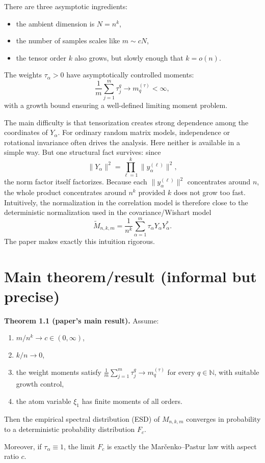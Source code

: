 \documentclass[11pt]{article}
\begin{document}
There are three asymptotic ingredients:
\begin{itemize}
    \item the ambient dimension is $N=n^k$,
    \item the number of samples scales like $m\sim cN$,
    \item the tensor order $k$ also grows, but slowly enough that $k=o(n)$.
\end{itemize}
The weights $\tau_\alpha>0$ have asymptotically controlled moments:
\[
\frac1m\sum_{j=1}^m \tau_j^q \to m_q^{(\tau)} < \infty,
\]
with a growth bound ensuring a well-defined limiting moment problem.

The main difficulty is that tensorization creates strong dependence among the coordinates of $Y_\alpha$. For ordinary random matrix models, independence or rotational invariance often drives the analysis. Here neither is available in a simple way. But one structural fact survives: since
\[
\|Y_\alpha\|^2 = \prod_{\ell=1}^k \|y_\alpha^{(\ell)}\|^2,
\]
the norm factor itself factorizes. Because each $\|y_\alpha^{(\ell)}\|^2$ concentrates around $n$, the whole product concentrates around $n^k$ provided $k$ does not grow too fast. Intuitively, the normalization in the correlation model is therefore close to the deterministic normalization used in the covariance/Wishart model
\[
\widetilde M_{n,k,m}=\frac1{n^k}\sum_{\alpha=1}^m \tau_\alpha Y_\alpha Y_\alpha^*.
\]
The paper makes exactly this intuition rigorous.

\section*{Main theorem/result (informal but precise)}
\textbf{Theorem 1.1 (paper's main result).} Assume:
\begin{enumerate}
    \item $m/n^k \to c\in(0,\infty)$,
    \item $k/n\to 0$,
    \item the weight moments satisfy
    $\frac1m\sum_{j=1}^m \tau_j^q \to m_q^{(\tau)}$ for every $q\in\mathbb N$, with suitable growth control,
    \item the atom variable $\xi_1$ has finite moments of all orders.
\end{enumerate}
Then the empirical spectral distribution (ESD) of $M_{n,k,m}$ converges in probability to a deterministic probability distribution $F_c$.

Moreover, if $\tau_\alpha\equiv 1$, the limit $F_c$ is exactly the Mar\v cenko--Pastur law with aspect ratio $c$.
\end{document}
